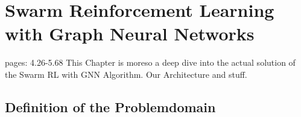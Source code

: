 
\chapter{Swarm Reinforcement Learning with Graph Neural Networks}
\label{ch:Architecture}
pages: 4.26-5.68
This Chapter is moreso a deep dive into the actual solution of the Swarm RL with GNN Algorithm. Our Architecture and stuff.
\section{Definition of the Problemdomain}
